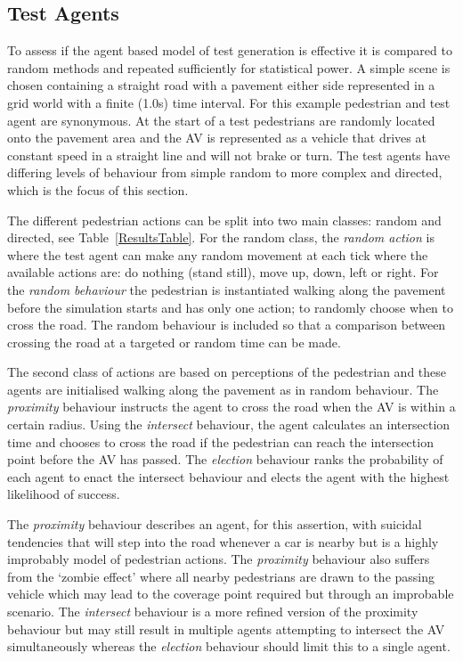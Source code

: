 \documentclass[letterpaper, 10 pt, journal, twoside]{IEEEtran}
\begin{document}
\subsection{Test Agents}
To assess if the agent based model of test generation is effective it is compared to random methods and repeated sufficiently for statistical power. A simple scene is chosen containing a straight road with a pavement either side represented in a grid world with a finite (1.0s) time interval. For this example pedestrian and test agent are synonymous. At the start of a test pedestrians are randomly located onto the pavement area and the AV is represented as a vehicle that drives at constant speed in a straight line and will not brake or turn. The test agents have differing levels of behaviour from simple random to more complex and directed, which is the focus of this section. 

The different pedestrian actions can be split into two main classes: random and directed, see Table~\ref{ResultsTable}. For the random class, the \textit{random action} is where the test agent can make any random movement at each tick where the available actions are: do nothing (stand still), move up, down, left or right. For the \textit{random behaviour} the pedestrian is instantiated walking along the pavement before the simulation starts and has only one action; to randomly choose when to cross the road. The random behaviour is included so that a comparison between crossing the road at a targeted or random time can be made. 

The second class of actions are based on perceptions of the pedestrian and these agents are initialised walking along the pavement as in random behaviour. The \textit{proximity} behaviour instructs the agent to cross the road when the AV is within a certain radius. Using the \textit{intersect} behaviour, the agent calculates an intersection time and chooses to cross the road if the pedestrian can reach the intersection point before the AV has passed. The \textit{election} behaviour ranks the probability of each agent to enact the intersect behaviour and elects the agent with the highest likelihood of success.

The \textit{proximity} behaviour describes an agent, for this assertion, with suicidal tendencies that will step into the road whenever a car is nearby but is a highly improbably model of pedestrian actions. The \textit{proximity} behaviour also suffers from the `zombie effect' where all nearby pedestrians are drawn to the passing vehicle which may lead to the coverage point required but through an improbable scenario. The \textit{intersect} behaviour is a more refined version of the proximity behaviour but may still result in multiple agents attempting to intersect the AV simultaneously whereas the \textit{election} behaviour should limit this to a single agent.
\end{document}
